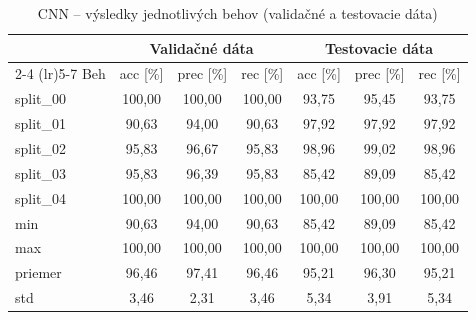 \begin{table}[H]
    \centering
    \caption{CNN -- výsledky jednotlivých behov (validačné a testovacie dáta)}
    \label{tab:runs-cnn}
    \footnotesize
    \begin{tabular}{lcccccc}
        \toprule
         & \multicolumn{3}{c}{Validačné dáta} & \multicolumn{3}{c}{Testovacie dáta} \\
        \cmidrule(lr){2-4} \cmidrule(lr){5-7}
        Beh & acc [\%] & prec [\%] & rec [\%] & acc [\%] & prec [\%] & rec [\%] \\
        \midrule
        split\_00 & 100,00 & 100,00 & 100,00 & 93,75 & 95,45 & 93,75 \\
        split\_01 & 90,63 & 94,00 & 90,63 & 97,92 & 97,92 & 97,92 \\
        split\_02 & 95,83 & 96,67 & 95,83 & 98,96 & 99,02 & 98,96 \\
        split\_03 & 95,83 & 96,39 & 95,83 & 85,42 & 89,09 & 85,42 \\
        split\_04 & 100,00 & 100,00 & 100,00 & 100,00 & 100,00 & 100,00 \\
        \midrule
        min & 90,63 & 94,00 & 90,63 & 85,42 & 89,09 & 85,42 \\
        max & 100,00 & 100,00 & 100,00 & 100,00 & 100,00 & 100,00 \\
        priemer & 96,46 & 97,41 & 96,46 & 95,21 & 96,30 & 95,21 \\
        std & 3,46 & 2,31 & 3,46 & 5,34 & 3,91 & 5,34 \\
        \bottomrule
    \end{tabular}
\end{table}
